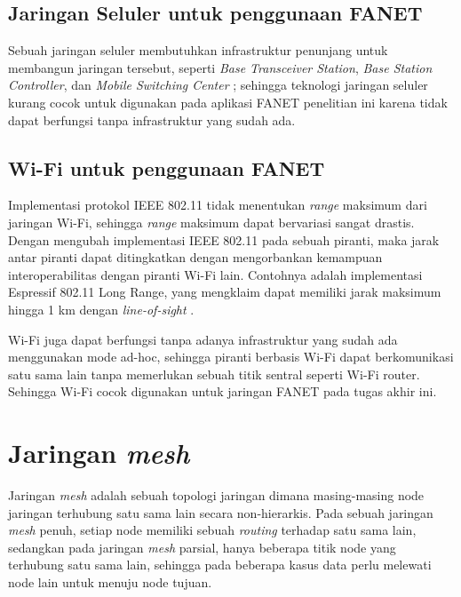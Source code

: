 \subsection{Jaringan Seluler untuk penggunaan FANET}
Sebuah jaringan seluler membutuhkan infrastruktur penunjang untuk membangun jaringan tersebut, seperti \textit{Base Transceiver Station}, \textit{Base Station Controller}, dan \textit{Mobile Switching Center} \cite{noauthor_cellular_nodate}; sehingga teknologi jaringan seluler kurang cocok untuk digunakan pada aplikasi FANET penelitian ini karena tidak dapat berfungsi tanpa infrastruktur yang sudah ada.
\subsection{Wi-Fi untuk penggunaan FANET}
Implementasi protokol IEEE 802.11 tidak menentukan \textit{range} maksimum dari jaringan Wi-Fi, sehingga \textit{range} maksimum dapat bervariasi sangat drastis. Dengan mengubah implementasi IEEE 802.11 pada sebuah piranti, maka jarak antar piranti dapat ditingkatkan dengan mengorbankan kemampuan interoperabilitas dengan piranti Wi-Fi lain. Contohnya adalah implementasi Espressif 802.11 Long Range, yang mengklaim dapat memiliki jarak maksimum hingga 1 km dengan \textit{line-of-sight} \cite{noauthor_wi-fi_nodate}. 

Wi-Fi juga dapat berfungsi tanpa adanya infrastruktur yang sudah ada menggunakan mode ad-hoc, sehingga piranti berbasis Wi-Fi dapat berkomunikasi satu sama lain tanpa memerlukan sebuah titik sentral seperti Wi-Fi router. Sehingga Wi-Fi cocok digunakan untuk jaringan FANET pada tugas akhir ini.

\section{Jaringan \textit{mesh}}
Jaringan \textit{mesh} adalah sebuah topologi jaringan dimana masing-masing node jaringan terhubung satu sama lain secara non-hierarkis. Pada sebuah jaringan \textit{mesh} penuh, setiap node memiliki sebuah \textit{routing} terhadap satu sama lain, sedangkan pada jaringan \textit{mesh} parsial, hanya beberapa titik node yang terhubung satu sama lain, sehingga pada beberapa kasus data perlu melewati node lain untuk menuju node tujuan.

